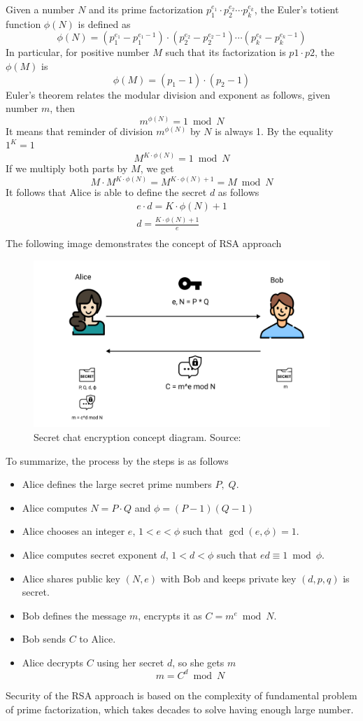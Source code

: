 Given a number $N$ and its prime factorization $p_1^{e_1}\cdot p_2^{e_2} \cdots p_k^{e_k}$, the Euler's totient function
$\phi(N)$ is defined as
\[
    \phi(N) = (p_1^{e_1} - p_1^{e_1 - 1}) \cdot (p_2^{e_2} - p_2^{e_2 - 1}) \cdots (p_k^{e_k} - p_k^{e_k - 1})
\]
In particular, for positive number $M$ such that its factorization is $p1 \cdot p2$, the $\phi(M)$ is
\[
    \phi(M) = (p_1 -1) \cdot (p_2 - 1)
\]
Euler's theorem relates the modular division and exponent as follows, given number $m$, then
\[
    m^{\phi(N)} = 1 \bmod N
\]
It means that reminder of division $m^{\phi(N)}$ by $N$ is always 1.
By the equality $1^K = 1$
\[
    M^{K \cdot \phi(N)} = 1 \bmod N
\]
If we multiply both parts by $M$, we get
\[
    M \cdot M^{K \cdot \phi(N)} = M^{K \cdot \phi(N) + 1} = M \bmod N
\]
It follows that Alice is able to define the secret $d$ as follows
\begin{gather*}
    e \cdot d = K \cdot \phi(N) + 1\\
    d = \frac{K \cdot \phi(N) + 1}{e}\\
\end{gather*}
The following image demonstrates the concept of RSA approach
\begin{figure}[H]
    \centering
    \includegraphics[width=1\textwidth]{Pictures/RSA_diagram}
    \caption{Secret chat encryption concept diagram. Source: }\label{fig:figure8}
\end{figure}
To summarize, the process by the steps is as follows
\begin{itemize}
    \item Alice defines the large secret prime numbers $P, \; Q$.
    \item Alice computes $N = P \cdot Q$ and $\phi = (P-1)(Q-1)$
    \item Alice chooses an integer $e$, $1<e< \phi$ such that $\gcd(e, \phi) = 1$.
    \item Alice computes secret exponent $d$, $1<d< \phi$ such that $ed \equiv 1 \bmod \phi$.
    \item Alice shares public key $(N,e)$ with Bob and keeps private key $(d, p, q)$ is secret.
    \item Bob defines the message $m$, encrypts it as $C = m^{e} \bmod N$.
    \item Bob sends $C$ to Alice.
    \item Alice decrypts $C$ using her secret $d$, so she gets $m$
    \[
        m = C^d \bmod N
    \]
\end{itemize}
Security of the RSA approach is based on the complexity of fundamental problem of prime factorization,
which takes decades to solve having enough large number.